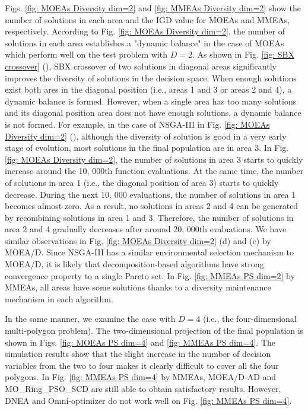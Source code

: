 \documentclass[conference]{IEEEtran}
\begin{document}
Figs. \ref{fig: MOEAs Diversity dim=2} and \ref{fig: MMEAs Diversity dim=2} show the number of solutions in each area and the IGD value for MOEAs and MMEAs, respectively. According to Fig. \ref{fig: MOEAs Diversity dim=2}, the number of solutions in each area establishes a "dynamic balance" in the case of MOEAs which perform well on the test problem with $D=2$. As shown in Fig. \ref{fig: SBX crossover} (), SBX crossover of two solutions in diagonal areas significantly improves the diversity of solutions in the decision space. When enough solutions exist both ares in the diagonal position (i.e., areas 1 and 3 or areas 2 and 4), a dynamic balance is formed. However, when a single area has too many solutions and its diagonal position area does not have enough solutions, a dynamic balance is not formed. For example, in the case of NSGA-III in Fig. \ref{fig: MOEAs Diversity dim=2} (), although the diversity of solution is good in a very early stage of evolution, most solutions in the final population are in area 3. In Fig. \ref{fig: MOEAs Diversity dim=2}, the number of solutions in area 3 starts to quickly increase around the 10, 000th function evaluations. At the same time, the number of solutions in area 1 (i.e., the diagonal position of area 3) starts to quickly decrease. During the next 10, 000 evaluations, the number of solutions in area 1 becomes almost zero. As a result, no solutions in areas 2 and 4 can be generated by recombining solutions in area 1 and 3. Therefore, the number of solutions in area 2 and 4 gradually decreases after around 20, 000th evaluations. We have similar observations in Fig. \ref{fig: MOEAs Diversity dim=2} (d) and (e) by MOEA/D. Since NSGA-III has a similar environmental selection mechanism to MOEA/D, it is likely that decomposition-based algorithms have strong convergence property to a single Pareto set. In Fig. \ref{fig: MMEAs PS dim=2} by MMEAs, all areas have some solutions thanks to a diversity maintenance mechanism in each algorithm.

In the same manner, we examine the case with $D=4$ (i.e., the four-dimensional multi-polygon problem). The two-dimensional projection of the final population is shown in Figs. \ref{fig: MOEAs PS dim=4} and \ref{fig: MMEAs PS dim=4}. The simulation results show that the slight increase in the number of decision variables from the two to four makes it clearly difficult to cover all the four polygons. In Fig. \ref{fig: MMEAs PS dim=4} by MMEAs, MOEA/D-AD and MO\_Ring\_PSO\_SCD are still able to obtain satisfactory results. However, DNEA and Omni-optimizer do not work well on Fig. \ref{fig: MMEAs PS dim=4}. 
\end{document}
